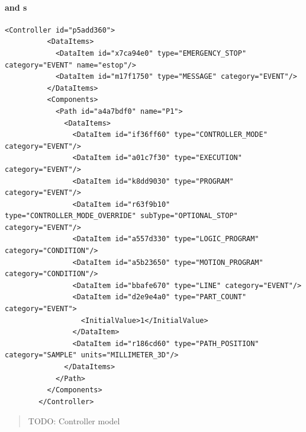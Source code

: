 \paragraph{ and  s}

\begin{lstlisting}[firstnumber=last,%
    caption={Controller and Path Components and Their Data Items},label={lst:controller-component}]
        <Controller id="p5add360">
          <DataItems>
            <DataItem id="x7ca94e0" type="EMERGENCY_STOP" category="EVENT" name="estop"/>
            <DataItem id="m17f1750" type="MESSAGE" category="EVENT"/>
          </DataItems>
          <Components>
            <Path id="a4a7bdf0" name="P1">
              <DataItems>
                <DataItem id="if36ff60" type="CONTROLLER_MODE" category="EVENT"/>
                <DataItem id="a01c7f30" type="EXECUTION" category="EVENT"/>
                <DataItem id="k8dd9030" type="PROGRAM" category="EVENT"/>
                <DataItem id="r63f9b10" type="CONTROLLER_MODE_OVERRIDE" subType="OPTIONAL_STOP" category="EVENT"/>
                <DataItem id="a557d330" type="LOGIC_PROGRAM" category="CONDITION"/>
                <DataItem id="a5b23650" type="MOTION_PROGRAM" category="CONDITION"/>
                <DataItem id="bbafe670" type="LINE" category="EVENT"/>
                <DataItem id="d2e9e4a0" type="PART_COUNT" category="EVENT">
                  <InitialValue>1</InitialValue>
                </DataItem>
                <DataItem id="r186cd60" type="PATH_POSITION" category="SAMPLE" units="MILLIMETER_3D"/>
              </DataItems>
            </Path>
          </Components>
        </Controller>
\end{lstlisting}

\begin{quote}
    \color{red} TODO: Controller model
\end{quote}

